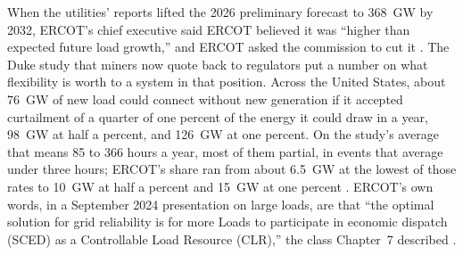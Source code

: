 When the utilities' reports lifted the 2026 preliminary forecast to 368~GW by 2032, ERCOT's chief executive said ERCOT believed it was ``higher than expected future load growth,'' and ERCOT asked the commission to cut it \autocite{ercot2026ltlfprelim,ercot2026ltlfadjust}. %
The Duke study that miners now quote back to regulators put a number on what flexibility is worth to a system in that position. Across the United States, about 76~GW of new load could connect without new generation if it accepted curtailment of a quarter of one percent of the energy it could draw in a year, 98~GW at half a percent, and 126~GW at one percent. On the study's average that means 85 to 366 hours a year, most of them partial, in events that average under three hours; ERCOT's share ran from about 6.5~GW at the lowest of those rates to 10~GW at half a percent and 15~GW at one percent \autocite{duke2025rethinking}. %
ERCOT's own words, in a September 2024 presentation on large loads, are that ``the optimal solution for grid reliability is for more Loads to participate in economic dispatch (SCED) as a Controllable Load Resource (CLR),'' the class Chapter~7 described \autocite{springer2024largeloads}. %
